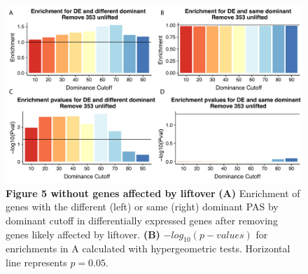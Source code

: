 \begin{figure}[!htb]
\centering
\includegraphics[width=5in]{img/ch03/Fig5-figSup1.pdf}
\caption[Figure 5 without genes affected by liftover]{\textbf{Figure 5 without genes affected by liftover} {\bf (A)}  Enrichment of genes with the different (left) or same (right) dominant PAS by dominant cutoff in differentially expressed genes after removing genes likely affected by liftover. {\bf (B)} $-log_{10}(p-values)$ for enrichments in A calculated with hypergeometric tests. Horizontal line represents $p= 0.05$.}
\label{fig:ch03-unliftfig4}
\end{figure}
\clearpage

